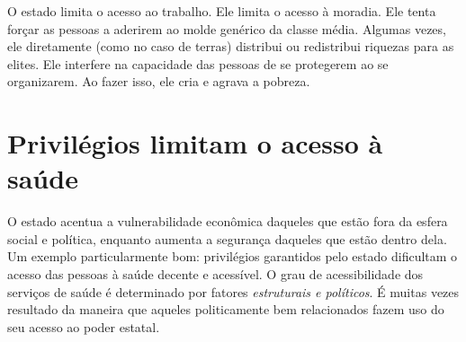 O estado limita o acesso ao trabalho. Ele limita o acesso à moradia. Ele tenta forçar as pessoas a aderirem ao molde genérico da classe média. Algumas vezes, ele diretamente (como no caso de terras) distribui ou redistribui riquezas para as elites. Ele interfere na capacidade das pessoas de se protegerem ao se organizarem. Ao fazer isso, ele cria e agrava a pobreza.

\section{Privilégios limitam o acesso à saúde}

O estado acentua a vulnerabilidade econômica daqueles que estão fora da esfera social e política, enquanto aumenta a segurança daqueles que estão dentro dela. Um exemplo particularmente bom: privilégios garantidos pelo estado dificultam o acesso das pessoas à saúde decente e acessível. O grau de acessibilidade dos serviços de saúde é determinado por fatores \emph{estruturais e políticos}. É muitas vezes resultado da maneira que aqueles politicamente bem relacionados fazem uso do seu acesso ao poder estatal.

